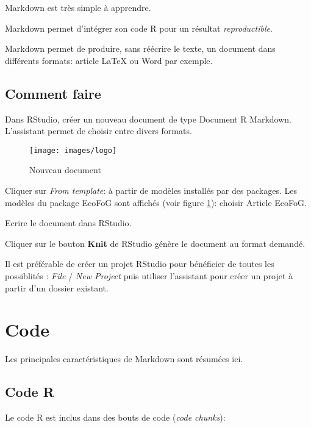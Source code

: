 \documentclass[fleqn,10pt]{latex/stylish_article} %
\begin{document}
Markdown est très simple à apprendre.

Markdown permet d'intégrer son code R pour un résultat \emph{reproductible}.

Markdown permet de produire, sans réécrire le texte, un document dans différents formats: article LaTeX ou Word par exemple.

\hypertarget{comment-faire}{%
\subsection{Comment faire}\label{comment-faire}}

Dans RStudio, créer un nouveau document de type Document R Markdown.
L'assistant permet de choisir entre divers formats.

\scriptsize

\begin{figure}

{\centering \texttt{[image: images/logo]} 

}

\caption{Nouveau document}\label{fig:nouveau}
\end{figure}

\normalsize

Cliquer sur \emph{From template}: à partir de modèles installés par des packages.
Les modèles du package EcoFoG sont affichés (voir figure \ref{fig:nouveau}): choisir Article EcoFoG.

Ecrire le document dans RStudio.

Cliquer sur le bouton \textbf{Knit} de RStudio génère le document au format demandé.

Il est préférable de créer un projet RStudio pour bénéficier de toutes les possiblités : \emph{File} / \emph{New Project} puis utiliser l'assistant pour créer un projet à partir d'un dossier existant.

\hypertarget{code}{%
\section{Code}\label{code}}

Les principales caractéristiques de Markdown sont résumées ici.

\hypertarget{code-r}{%
\subsection{Code R}\label{code-r}}

Le code R est inclus dans des bouts de code (\emph{code chunks}):
\end{document}
